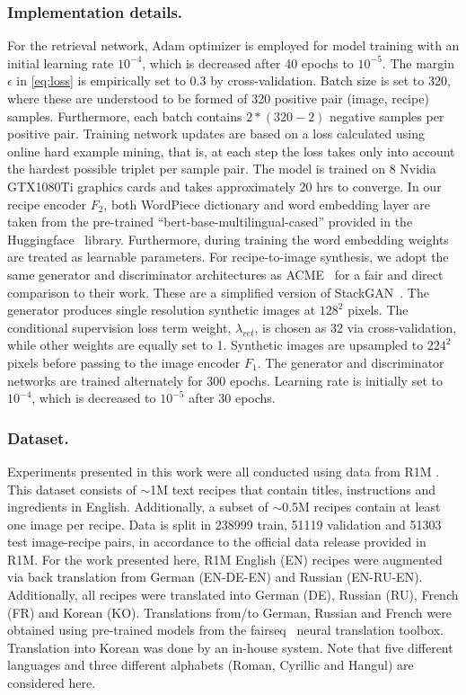 \documentclass[sigconf,nonacm]{acmart}
\begin{document}
\subsubsection*{\textbf{Implementation details.}} For the retrieval network, Adam optimizer \cite{adam} is employed for model training with an initial learning rate $10^{-4}$, which is decreased after 40 epochs to $10^{-5}$. The margin $\epsilon$ in \autoref{eq:loss} is empirically set to 0.3 by cross-validation. Batch size is set to 320, where these are understood to be formed of 320 positive pair (image, recipe) samples. Furthermore, each batch contains $2*(320-2)$ negative samples per positive pair. Training network updates are based on a loss calculated using online hard example mining, that is, at each step the loss takes only into account the hardest possible triplet per sample pair. The model is trained on 8 Nvidia GTX1080Ti graphics cards and takes approximately 20 hrs to converge. In our recipe encoder $F_2$, both WordPiece dictionary and word embedding layer are taken from the pre-trained ``bert-base-multilingual-cased'' provided in the Huggingface~\cite{huggingface} library. Furthermore, during training the word embedding weights are treated as learnable parameters. For recipe-to-image synthesis, we adopt the same generator and discriminator architectures as ACME~\cite{wang2019} for a fair and direct comparison to their work. These are a simplified version of StackGAN~\cite{Zhang2017-jm}. The generator produces single resolution synthetic images at $128^2$ pixels. The conditional supervision loss term weight, $\lambda _{ret}$, is chosen as 32 via cross-validation, while other weights are equally set to 1. Synthetic images are upsampled to $224^2$ pixels before passing to the image encoder $F_1$. The generator and discriminator networks are trained alternately for 300 epochs. Learning rate is initially set to $10^{-4}$, which is decreased to $10^{-5}$ after 30 epochs.

\subsubsection*{\textbf{Dataset.}}
Experiments presented in this work were all conducted using data from R1M \cite{salvador2017,marin2019}. This dataset consists of $\sim$1M text recipes that contain titles, instructions and ingredients in English. Additionally, a subset of $\sim$0.5M recipes contain at least one image per recipe. Data is split in 238999 train, 51119 validation and 51303 test image-recipe pairs, in accordance to the official data release provided in R1M. For the work presented here, R1M English (EN) recipes were augmented via back translation from German (EN-DE-EN) and Russian (EN-RU-EN). Additionally, all recipes were translated into German (DE), Russian (RU), French (FR) and Korean (KO). Translations from/to German, Russian and French were obtained using pre-trained models from the fairseq~\cite{ott2019fairseq} neural translation toolbox. Translation into Korean was done by an in-house system. Note that five different languages and three different alphabets (Roman, Cyrillic and Hangul) are considered here.
\end{document}
